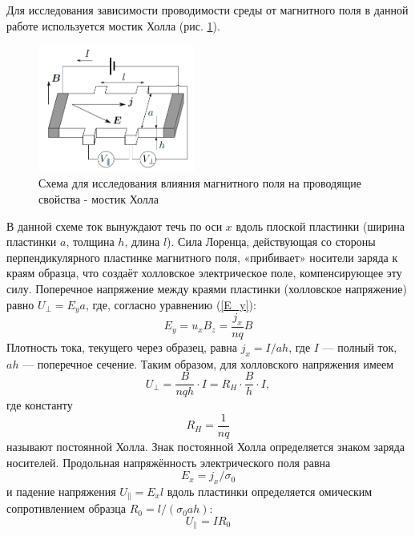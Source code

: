 \documentclass[a4paper,12pt]{article} %
\begin{document}
Для исследования зависимости проводимости среды от магнитного
поля в данной работе используется \textsf{мостик Холла} (рис. \ref{мостик}).
\begin{figure}[h!]
\begin{center}
\includegraphics[width=0.46\textwidth]{Мостик}
\caption{Схема для исследования влияния магнитного поля на проводящие
свойства - мостик Холла} \label{мостик}
\end{center}
\end{figure}
В данной схеме ток вынуждают
течь по оси $x$ вдоль плоской пластинки (ширина пластинки $a$, толщина $h$,
длина $l$). Сила Лоренца, действующая со стороны перпендикулярного
пластинке магнитного поля, «прибивает» носители заряда к краям образца,
что создаёт холловское электрическое поле, компенсирующее эту
силу. Поперечное напряжение между краями пластинки (\textsf{холловское 
напряжение}) равно $U_\perp = E_ya$, где, согласно уравнению (\ref{E_y}):
\begin{equation}
E_y=u_xB_z=\dfrac{j_x}{nq}B
\end{equation}
Плотность тока, текущего через образец, равна $j_x=I/ah$, где $I$ — полный
ток, $ah$ — поперечное сечение. Таким образом, для холловского напряжения
имеем
\begin{equation}
\label{формула}
U_\perp = \frac{B}{nqh}\cdot I=R_H\cdot \frac{B}{h}\cdot I,
\end{equation}
где константу
\begin{equation}
R_H = \frac{1}{nq}
\end{equation}
называют \textsf{постоянной Холла}. Знак постоянной Холла определяется
знаком заряда носителей.
Продольная напряжённость электрического поля равна
\begin{equation}
E_x=j_x/\sigma_0
\end{equation}
и падение напряжения $U_\parallel = E_x l$ вдоль пластинки определяется омическим
сопротивлением образца $R_0 = l/(\sigma_0 a h)$:
\begin{equation}
U_\parallel = IR_0
\end{equation}
 
\end{document}
